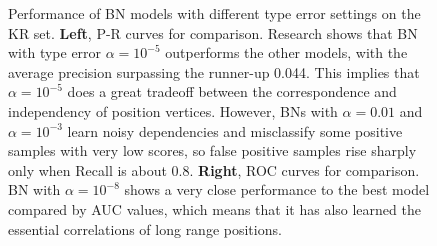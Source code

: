 \documentclass[journal,twoside]{IEEEtran}
\begin{document}
\begin{figure}[htbp]
\caption{Performance of BN models with different type \uppercase\expandafter{} error settings on the KR set. \textbf{Left}, P-R curves for comparison. Research shows that BN with type \uppercase\expandafter{} error $\alpha=10^{-5}$ outperforms the other models, with the average precision surpassing the runner-up 0.044. This implies that $\alpha=10^{-5}$ does a great tradeoff between the correspondence and independency of position vertices. However, BNs with $\alpha=0.01$ and $\alpha=10^{-3}$ learn noisy dependencies and misclassify some positive samples with very low scores, so false positive samples rise sharply only when Recall is about 0.8. \textbf{Right}, ROC curves for comparison. BN with $\alpha=10^{-8}$ shows a very close performance to the best model compared by AUC values, which means that it has also learned the essential correlations of long range positions. }
\label{fig4}
\end{figure}
\end{document}
